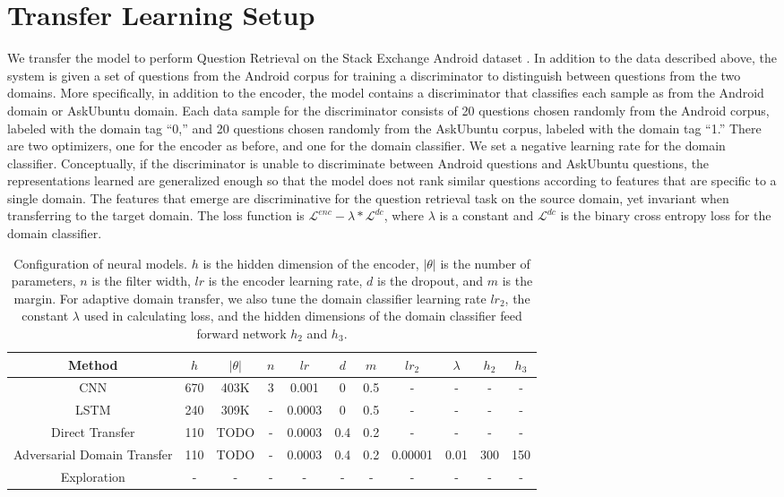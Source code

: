 \documentclass[11pt,a4paper]{article}
\begin{document}
\section{Transfer Learning Setup}
We transfer the model to perform Question Retrieval on the Stack Exchange Android dataset \cite{guo}. In addition to the data described above, the system is given a set of questions from the Android corpus for training a discriminator to distinguish between questions from the two domains. More specifically, in addition to the encoder, the model contains a discriminator that classifies each sample as from the Android domain or AskUbuntu domain. Each data sample for the discriminator consists of 20 questions chosen randomly from the Android corpus, labeled with the domain tag “0,” and 20 questions chosen randomly from the AskUbuntu corpus, labeled with the domain tag “1.” There are two optimizers, one for the encoder as before, and one for the domain classifier. We set a negative learning rate for the domain classifier. Conceptually, if the discriminator is unable to discriminate between Android questions and AskUbuntu questions, the representations learned are generalized enough so that the model does not rank similar questions according to features that are specific to a single domain. The features that emerge are discriminative for the question retrieval task on the source domain, yet invariant when transferring to the target domain. The loss function is $\mathcal{L}^{enc} - \lambda* \mathcal{L}^{dc}$, where $\lambda$ is a constant and  $\mathcal{L}^{dc}$ is the binary cross entropy loss for the domain classifier.

\begin{table*}[ht]
\centering
\begin{tabular}{c|cccccccccc}
\hline
Method & $h$ & $|\theta|$ & $n$ & $lr$ & $d$ & $m$ & $lr_2$ & $\lambda$ & $h_2$ & $h_3$ \\
\hline
CNN     & 670 & 403K & 3 & 0.001 & 0 & 0.5 & - & - & - & -\\
LSTM    & 240 & 309K & - & 0.0003 & 0 & 0.5 & - & - & - & -\\
Direct Transfer & 110 & TODO & - & 0.0003 & 0.4 & 0.2 & - & - & - & -\\
Adversarial Domain Transfer & 110 & TODO & - & 0.0003 & 0.4 & 0.2 & 0.00001 & 0.01 & 300 & 150\\
Exploration & - & - & - & - & - & - & - & - & - & -\\
\hline
\end{tabular}
\caption{Configuration of neural models. $h$ is the hidden dimension of the encoder, $|\theta|$ is the number of parameters, $n$ is the filter width, $lr$ is the encoder learning rate, $d$ is the dropout, and $m$ is the margin. For adaptive domain transfer, we also tune the domain classifier learning rate $lr_2$, the constant $\lambda$ used in calculating loss, and the hidden dimensions of the domain classifier feed forward network $h_2$ and $h_3$.}
\label{table1}
\end{table*}
\end{document}
